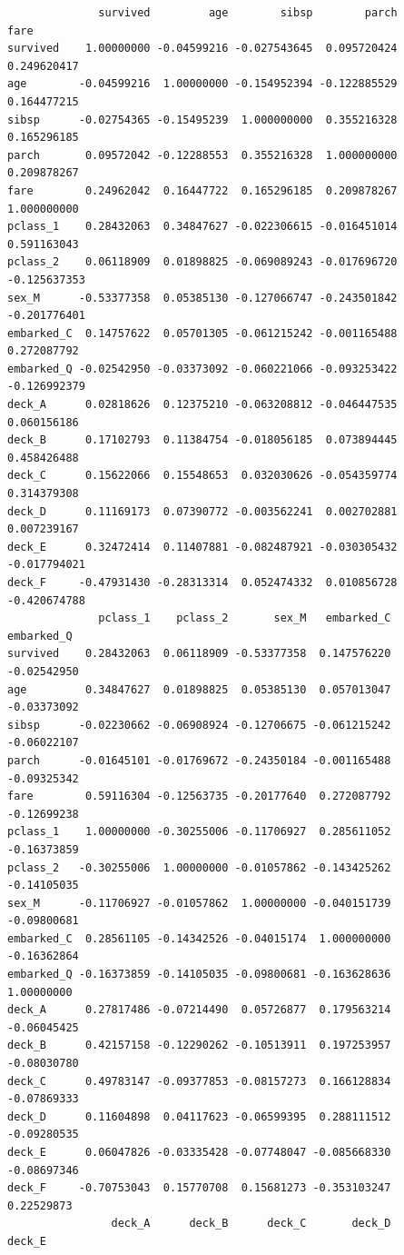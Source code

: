 \documentclass[
  letterpaper,
  DIV=11,
  numbers=noendperiod]{scrartcl}
\begin{document}
\begin{verbatim}
              survived         age        sibsp        parch         fare
survived    1.00000000 -0.04599216 -0.027543645  0.095720424  0.249620417
age        -0.04599216  1.00000000 -0.154952394 -0.122885529  0.164477215
sibsp      -0.02754365 -0.15495239  1.000000000  0.355216328  0.165296185
parch       0.09572042 -0.12288553  0.355216328  1.000000000  0.209878267
fare        0.24962042  0.16447722  0.165296185  0.209878267  1.000000000
pclass_1    0.28432063  0.34847627 -0.022306615 -0.016451014  0.591163043
pclass_2    0.06118909  0.01898825 -0.069089243 -0.017696720 -0.125637353
sex_M      -0.53377358  0.05385130 -0.127066747 -0.243501842 -0.201776401
embarked_C  0.14757622  0.05701305 -0.061215242 -0.001165488  0.272087792
embarked_Q -0.02542950 -0.03373092 -0.060221066 -0.093253422 -0.126992379
deck_A      0.02818626  0.12375210 -0.063208812 -0.046447535  0.060156186
deck_B      0.17102793  0.11384754 -0.018056185  0.073894445  0.458426488
deck_C      0.15622066  0.15548653  0.032030626 -0.054359774  0.314379308
deck_D      0.11169173  0.07390772 -0.003562241  0.002702881  0.007239167
deck_E      0.32472414  0.11407881 -0.082487921 -0.030305432 -0.017794021
deck_F     -0.47931430 -0.28313314  0.052474332  0.010856728 -0.420674788
              pclass_1    pclass_2       sex_M   embarked_C  embarked_Q
survived    0.28432063  0.06118909 -0.53377358  0.147576220 -0.02542950
age         0.34847627  0.01898825  0.05385130  0.057013047 -0.03373092
sibsp      -0.02230662 -0.06908924 -0.12706675 -0.061215242 -0.06022107
parch      -0.01645101 -0.01769672 -0.24350184 -0.001165488 -0.09325342
fare        0.59116304 -0.12563735 -0.20177640  0.272087792 -0.12699238
pclass_1    1.00000000 -0.30255006 -0.11706927  0.285611052 -0.16373859
pclass_2   -0.30255006  1.00000000 -0.01057862 -0.143425262 -0.14105035
sex_M      -0.11706927 -0.01057862  1.00000000 -0.040151739 -0.09800681
embarked_C  0.28561105 -0.14342526 -0.04015174  1.000000000 -0.16362864
embarked_Q -0.16373859 -0.14105035 -0.09800681 -0.163628636  1.00000000
deck_A      0.27817486 -0.07214490  0.05726877  0.179563214 -0.06045425
deck_B      0.42157158 -0.12290262 -0.10513911  0.197253957 -0.08030780
deck_C      0.49783147 -0.09377853 -0.08157273  0.166128834 -0.07869333
deck_D      0.11604898  0.04117623 -0.06599395  0.288111512 -0.09280535
deck_E      0.06047826 -0.03335428 -0.07748047 -0.085668330 -0.08697346
deck_F     -0.70753043  0.15770708  0.15681273 -0.353103247  0.22529873
                deck_A      deck_B      deck_C       deck_D      deck_E

\end{verbatim}
\end{document}
